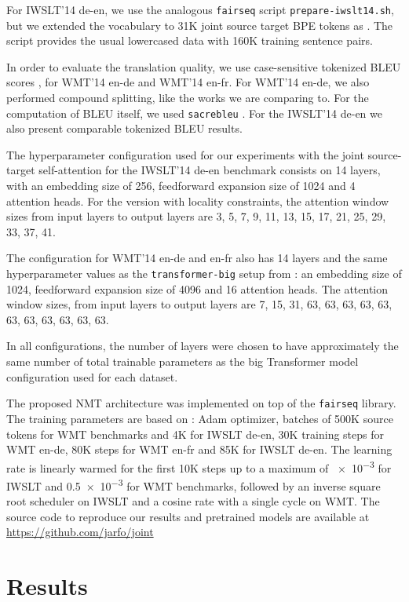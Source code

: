 \documentclass[11pt,a4paper]{article}
\begin{document}
For IWSLT'14 de-en, we use the analogous \texttt{fairseq} script
\texttt{prepare-iwslt14.sh}, but we extended the vocabulary to 31K joint
source target BPE  tokens as . The script
provides the usual lowercased data with 160K training sentence pairs.

In order to evaluate the translation quality, we use case-sensitive tokenized
BLEU scores \cite{papineni2002bleu}, for WMT'14 en-de and WMT'14 en-fr.
For WMT'14 en-de, we also performed compound splitting,
like the works we are comparing to. For the computation of BLEU itself, we used
\texttt{sacrebleu} \cite{post2018sacrebleu}. For the IWSLT'14 de-en we also
present comparable tokenized BLEU results.

The hyperparameter configuration used for our experiments with the joint source-target
self-attention for the IWSLT'14 de-en benchmark consists on 14 layers, with an embedding 
size of 256, feedforward expansion size of 1024 and 4 attention heads. For the version 
with locality constraints, the attention window sizes from input layers to output layers are
3, 5, 7, 9, 11, 13, 15, 17, 21, 25, 29, 33, 37, 41.

The configuration for WMT'14 en-de and en-fr also has 14 layers and
the same hyperparameter values as the \texttt{transformer-big}
setup from \cite{vaswani2017transformer}: an embedding 
size of 1024, feedforward expansion size of 4096 and 16 attention heads.
The attention window sizes, from input layers to output layers are
7, 15, 31, 63, 63, 63, 63, 63, 63, 63, 63, 63, 63, 63.

In all configurations, the number of layers were chosen to
have approximately the same number of total trainable parameters
as the big Transformer model configuration used for each dataset.

The proposed NMT architecture was implemented on top of the \texttt{fairseq}
library. The training parameters are based on \cite{wu2018dynconv}: Adam optimizer, 
batches of 500K source tokens for WMT benchmarks and 4K for IWSLT de-en, 
30K training steps for WMT en-de, 80K steps for WMT en-fr and 85K for IWSLT de-en.
The learning rate is linearly warmed for the first 10K steps up to a maximum of 
\num{e-3} for IWSLT and \num{0.5e-3} for WMT benchmarks,
followed by an inverse square root scheduler on IWSLT and a cosine rate with a single cycle on WMT.
The source code to reproduce our results and pretrained models are available
at \url{https://github.com/jarfo/joint}

\section{Results} \label{sec:results}
\end{document}

